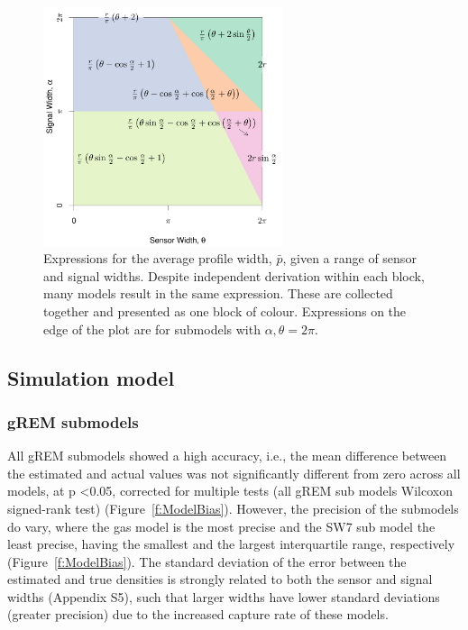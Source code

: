 \documentclass[a4paper,10pt,reqno,oneside]{amsart}
\begin{document}
\begin{figure}
	\centering
	\includegraphics[width=7cm]{imgs/equalModelResults.pdf}
	\caption{Expressions for the average profile width, $\bar{p}$, given a range of sensor and signal widths. Despite independent derivation within each block, many models result in the same expression. These are collected together and presented as one block of colour. Expressions on the edge of the plot are for submodels with $\alpha, \theta = 2\pi$. }
	\label{f:equalModelResults}
\end{figure}



\subsection*{Simulation model}

\subsubsection*{gREM submodels}
All gREM submodels showed a high accuracy, i.e., the mean difference between the estimated and actual values was not significantly different from zero across all models, at p \textless 0.05, corrected for multiple tests (all gREM sub models Wilcoxon signed-rank test) (Figure~\ref{f:ModelBias}). However, the precision of the submodels do vary, where the gas model is the most precise and the SW7 sub model the least precise, having the smallest and the largest interquartile range, respectively (Figure~\ref{f:ModelBias}). The standard deviation of the error between the estimated and true densities is strongly related to both the sensor and signal widths (Appendix S5), such that larger widths have lower standard deviations (greater precision) due to the increased capture rate of these models.
\end{document}
